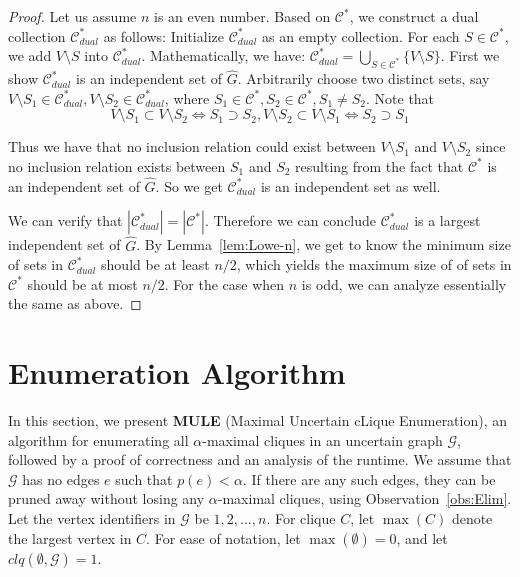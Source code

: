 \documentclass[11pt,letterpaper]{article}
\newcommand{\ugraph}{\mathcal{G}}
\newcommand{\cliqueprob}{clq}
\begin{document}
\begin{proof}
Let us assume $n$ is an even number.
Based on $\mathcal{C}^*$, we
construct a dual collection $\mathcal{C}^*_{dual}$ as follows:
Initialize $\mathcal{C}^*_{dual}$ as an empty collection.
For each $S\in \mathcal{C}^*$, we add $V \setminus S$ into $\mathcal{C}^*_{dual}$.
Mathematically, we have: $\mathcal{C}^*_{dual}=\bigcup_{S\in \mathcal{C}^*} \{V \setminus S\}$.
First we show $\mathcal{C}^*_{dual}$ is an independent set of $\widehat{G}$.
Arbitrarily choose two distinct sets,
say $V \setminus S_1 \in \mathcal{C}^*_{dual}, V \setminus S_2 \in \mathcal{C}^*_{dual}$, where
$S_1 \in \mathcal{C}^*, S_2 \in \mathcal{C}^*, S_1 \ne S_2$. Note that
$$V \setminus S_1 \subset  V \setminus S_2 \Leftrightarrow S_1 \supset S_2, V \setminus S_2 \subset  V \setminus S_1 \Leftrightarrow S_2 \supset S_1 $$

Thus we have that no inclusion relation could exist between $V \setminus S_1$ and $V \setminus S_2$ since
no inclusion relation exists between $S_1$ and $S_2$ resulting from the fact that
$\mathcal{C}^*$ is an independent set of $\widehat{G}$. So we get
$\mathcal{C}^*_{dual}$ is an independent set as well.

We can verify that $|\mathcal{C}^*_{dual}|=|\mathcal{C}^*|$. Therefore we can conclude
$\mathcal{C}^*_{dual}$ is a largest independent set of $\widehat{G}$.
By Lemma~\ref{lem:Lowe-n}, we get to know the minimum size of sets in
$\mathcal{C}^*_{dual}$ should be at least $n/2$, which yields the maximum size of
of sets in $\mathcal{C}^*$ should be at most $n/2$.
For the case when $n$ is odd, we can analyze essentially the same as above. 
\end{proof}

\section{Enumeration Algorithm}
\label{sec:algorithms}

In this section, we present {\bf MULE} (Maximal Uncertain cLique Enumeration), an algorithm for enumerating all $\alpha$-maximal cliques in an uncertain graph $\ugraph$, followed by a proof of correctness and an analysis of the runtime. We assume that $\ugraph$ has no edges $e$ such that $p(e) < \alpha$.  If there are any such edges, they can be pruned away without losing any $\alpha$-maximal cliques, using Observation~\ref{obs:Elim}.  Let the vertex identifiers in $\ugraph$ be $1,2,\ldots,n$. For clique $C$, let $\max(C)$ denote the largest vertex in $C$.  For ease of notation, let $\max(\emptyset) = 0$, and let $\cliqueprob(\emptyset,\ugraph) = 1$. 
\end{document}
